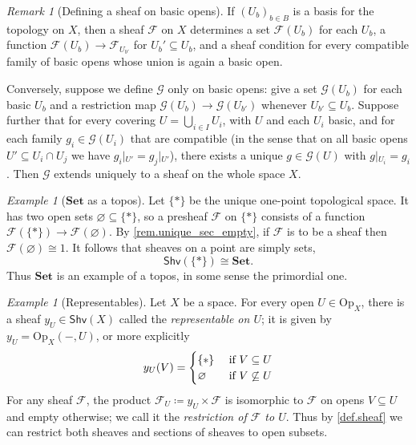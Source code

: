 \documentclass[11pt, oneside, article]{memoir}
\theoremstyle{plain}
\theoremstyle{definition}
\theoremstyle{remark}
\newtheorem{example}[theorem]{Example}
\newtheorem{remark}[theorem]{Remark}
\renewcommand{\ss}{\subseteq}
\newcommand{\Set}[1]{\mathrm{#1}}
\newcommand{\Cat}[1]{\mathbf{#1}}
\newcommand{\fun}[1]{\mathcal{#1}}
\newcommand{\Fun}[1]{\mathsf{#1}}
\newcommand{\sheaf}[1]{\fun{#1}}
\newcommand{\smset}{\Cat{Set}}
\newcommand{\tn}[1]{\textnormal{#1}}
\newcommand{\shv}{\Fun{Shv}}
\newcommand{\Op}{\Set{Op}}
\newcommand{\rest}[2]{#1\big|\hspace{0in}_{#2}}
\begin{document}
\begin{remark}[Defining a sheaf on basic opens]
If $(U_b)_{b\in B}$ is a basis for the topology on $X$, then a sheaf $\sheaf{F}$ on $X$ determines a set $\sheaf{F}(U_b)$ for each $U_b$, a function $\sheaf{F}(U_b)\to\sheaf{F}_{U_{b'}}$ for $U_b'\ss U_b$, and a sheaf condition for every compatible family of basic opens whose union is again a basic open. 

Conversely, suppose we define $\sheaf{G}$ only on basic opens: give a set $\sheaf{G}(U_b)$ for each basic $U_b$ and a restriction map $\sheaf{G}(U_b)\to\sheaf{G}(U_{b'})$ whenever $U_{b'}\ss U_b$. Suppose further that for every covering $U=\bigcup_{i\in I}U_i$, with $U$ and each $U_i$ basic, and for each family $g_i\in\sheaf{G}(U_i)$ that are compatible (in the sense that on all basic opens $U'\ss U_i\cap U_j$ we have $\rest{g_i}{U'}=\rest{g_j}{U'}$), there exists a unique $g\in \sheaf{G}(U)$ with $\rest{g}{U_i}=g_i$. Then $\sheaf{G}$ extends uniquely to a sheaf on the whole space $X$.
\end{remark}

\begin{example}[$\smset$ as a topos]\label{ex.set_topos}
Let $\{*\}$ be the unique one-point topological space. It has two open sets $\varnothing\ss\{*\}$, so a presheaf $\sheaf{F}$ on $\{*\}$ consists of a function $\sheaf{F}(\{*\})\to\sheaf{F}(\varnothing)$. By \cref{rem.unique_sec_empty}, if $\sheaf{F}$ is to be a sheaf then $\sheaf{F}(\varnothing)\cong 1$. It follows that sheaves on a point are simply sets,
\[
\shv(\{*\})\cong\smset.
\]
Thus $\smset$ is an example of a topos, in some sense the primordial one.
\end{example}

\begin{example}[Representables]\label{ex.representable_sheaf}
Let $X$ be a space. For every open $U\in\Op_X$, there is a sheaf $y_U\in\shv(X)$ called the \emph{representable on $U$}; it is given by $y_U=\Op_X(-,U)$, or more explicitly
\[
	y_U(V)=
	\begin{cases}
	\{*\}&\tn{ if }V\ss U\\
	\varnothing&\tn{ if }V\not\ss U
	\end{cases}
\]
For any sheaf $\sheaf{F}$, the product $\sheaf{F}_U\coloneqq y_U\times\sheaf{F}$ is isomorphic to $\sheaf{F}$ on opens $V\ss U$ and empty otherwise; we call it the \emph{restriction of $\sheaf{F}$ to $U$}. Thus by \cref{def.sheaf} we can restrict both sheaves and sections of sheaves to open subsets.
\end{example}
\end{document}
